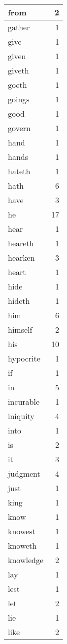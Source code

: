 \begin{center}
\begin{longtable}{l|r}
from & 2 \\ \hline
gather & 1 \\ \hline
give & 1 \\ \hline
given & 1 \\ \hline
giveth & 1 \\ \hline
goeth & 1 \\ \hline
goings & 1 \\ \hline
good & 1 \\ \hline
govern & 1 \\ \hline
hand & 1 \\ \hline
hands & 1 \\ \hline
hateth & 1 \\ \hline
hath & 6 \\ \hline
have & 3 \\ \hline
he & 17 \\ \hline
hear & 1 \\ \hline
heareth & 1 \\ \hline
hearken & 3 \\ \hline
heart & 1 \\ \hline
hide & 1 \\ \hline
hideth & 1 \\ \hline
him & 6 \\ \hline
himself & 2 \\ \hline
his & 10 \\ \hline
hypocrite & 1 \\ \hline
if & 1 \\ \hline
in & 5 \\ \hline
incurable & 1 \\ \hline
iniquity & 4 \\ \hline
into & 1 \\ \hline
is & 2 \\ \hline
it & 3 \\ \hline
judgment & 4 \\ \hline
just & 1 \\ \hline
king & 1 \\ \hline
know & 1 \\ \hline
knowest & 1 \\ \hline
knoweth & 1 \\ \hline
knowledge & 2 \\ \hline
lay & 1 \\ \hline
lest & 1 \\ \hline
let & 2 \\ \hline
lie & 1 \\ \hline
like & 2 \\ \hline

\end{longtable}
\end{center}
